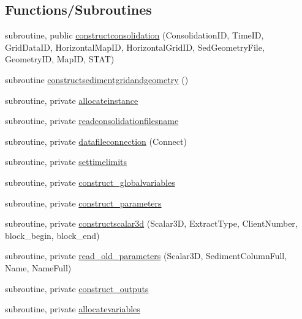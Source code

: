 \subsection*{Functions/\+Subroutines}
\begin{DoxyCompactItemize}
\item 
subroutine, public \mbox{\hyperlink{namespacemoduleconsolidation_aac026f0503f905b1fdf70f85f58f7b69}{constructconsolidation}} (Consolidation\+ID, Time\+ID, Grid\+Data\+ID, Horizontal\+Map\+ID, Horizontal\+Grid\+ID, Sed\+Geometry\+File, Geometry\+ID, Map\+ID, S\+T\+AT)
\item 
subroutine \mbox{\hyperlink{namespacemoduleconsolidation_a7fa231a9af605419b5dbc619d4e2a60f}{constructsedimentgridandgeometry}} ()
\item 
subroutine, private \mbox{\hyperlink{namespacemoduleconsolidation_ab891ed95a8328cd00b80d32b5bbc6bb6}{allocateinstance}}
\item 
subroutine, private \mbox{\hyperlink{namespacemoduleconsolidation_adc874bdb2826879904126cec4cd75459}{readconsolidationfilesname}}
\item 
subroutine, private \mbox{\hyperlink{namespacemoduleconsolidation_a59eaaf93a76021e109b8d97e2756ac51}{datafileconnection}} (Connect)
\item 
subroutine, private \mbox{\hyperlink{namespacemoduleconsolidation_a8f78f5569405ac5d416a2919286511f3}{settimelimits}}
\item 
subroutine, private \mbox{\hyperlink{namespacemoduleconsolidation_a4d351c8e79499df7d1edcdc11c64fd58}{construct\+\_\+globalvariables}}
\item 
subroutine, private \mbox{\hyperlink{namespacemoduleconsolidation_a4699e64424e9e130e7f46758181721ec}{construct\+\_\+parameters}}
\item 
subroutine, private \mbox{\hyperlink{namespacemoduleconsolidation_af867c8406bedea1eef3287708029fa21}{constructscalar3d}} (Scalar3D, Extract\+Type, Client\+Number, block\+\_\+begin, block\+\_\+end)
\item 
subroutine, private \mbox{\hyperlink{namespacemoduleconsolidation_ad228e075c84afa273170a1c50c1a9f41}{read\+\_\+old\+\_\+parameters}} (Scalar3D, Sediment\+Column\+Full, Name, Name\+Full)
\item 
subroutine, private \mbox{\hyperlink{namespacemoduleconsolidation_a1c6db66f62288736bfc6a93bb76fb12c}{construct\+\_\+outputs}}
\item 
subroutine, private \mbox{\hyperlink{namespacemoduleconsolidation_a8bde788846d06954ea13eb84223da96a}{allocatevariables}}

\end{DoxyCompactItemize}
